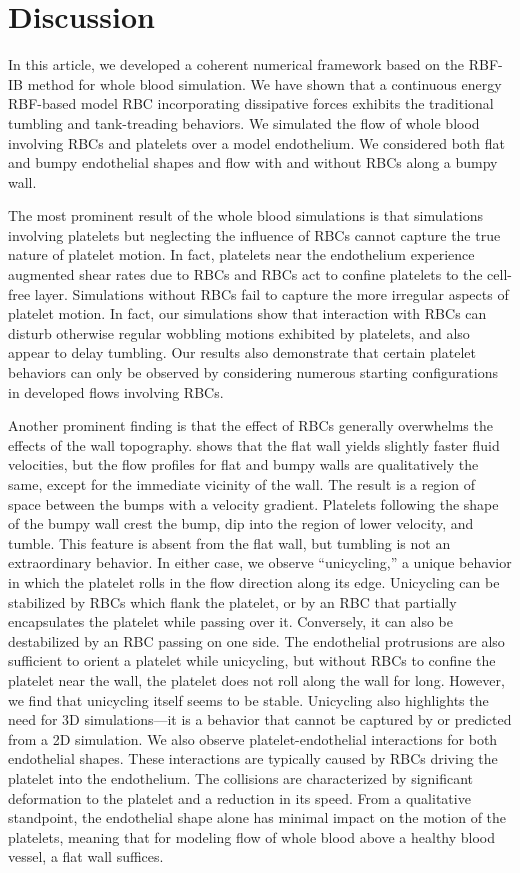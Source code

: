 \section{Discussion}\label{sec:conclusion}

In this article, we developed a coherent numerical framework based on the RBF-IB method for whole blood
simulation. We have shown that a continuous energy RBF-based model RBC incorporating dissipative forces exhibits
the traditional tumbling and tank-treading behaviors. We simulated the flow of whole blood involving RBCs and
platelets over a model endothelium. We considered both flat and bumpy endothelial shapes and flow with and without
RBCs along a bumpy wall.

The most prominent result of the whole blood simulations is that simulations involving platelets but neglecting
the influence of RBCs cannot capture the true nature of platelet motion. In fact, platelets near the endothelium
experience augmented shear rates due to RBCs and RBCs act to confine platelets to the cell-free layer. Simulations
without RBCs fail to capture the more irregular aspects of platelet motion. In fact, our simulations show that
interaction with RBCs can disturb otherwise regular wobbling motions exhibited by platelets, and also appear to
delay tumbling. Our results also demonstrate that certain platelet behaviors can only be observed by considering
numerous starting configurations in developed flows involving RBCs.

Another prominent finding is that the effect of RBCs generally overwhelms the effects of the wall topography.
 shows that the flat wall yields slightly faster fluid velocities, but the flow profiles
for flat and bumpy walls are qualitatively the same, except for the immediate vicinity of the wall. The result is
a region of space between the bumps with a velocity gradient. Platelets following the shape of the bumpy wall
crest the bump, dip into the region of lower velocity, and tumble. This feature is absent from the flat wall, but
tumbling is not an extraordinary behavior. In either case, we observe ``unicycling\qend,'' a unique behavior in
which the platelet rolls in the flow direction along its edge. Unicycling can be stabilized by RBCs which flank
the platelet, or by an RBC that partially encapsulates the platelet while passing over it. Conversely, it can also
be destabilized by an RBC passing on one side. The endothelial protrusions are also sufficient to orient a platelet
while unicycling, but without RBCs to confine the platelet near the wall, the platelet does not roll along the
wall for long. However, we find that unicycling itself seems to be stable. Unicycling also highlights the need for
3D simulations---it is a behavior that cannot be captured by or predicted from a 2D simulation. We also observe
platelet-endothelial interactions for both endothelial shapes. These interactions are typically caused by RBCs
driving the platelet into the endothelium. The collisions are characterized by significant deformation to the
platelet and a reduction in its speed. From a qualitative standpoint, the endothelial shape alone has minimal
impact on the motion of the platelets, meaning that for modeling flow of whole blood above a healthy blood vessel, a flat wall suffices.

